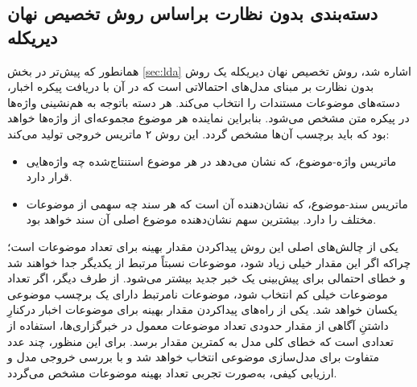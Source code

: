 \subsection{دسته‌بندی بدون‌ نظارت براساس روش تخصیص نهان دیریکله}
\label{section.lda_classification}
همانطور که پیش‌تر در بخش \ref{sec:lda} اشاره شد، روش تخصیص نهان دیریکله \citep{blei2003latent} یک روش بدون‌ نظارت بر مبنای مدل‌های احتمالاتی است که در آن با دریافت  پیکره  اخبار، دسته‌های موضوعات مستندات را انتخاب می‌کند. هر دسته باتوجه ‌به هم‌نشینی واژه‌ها در پیکره متن مشخص می‌شود. بنابراین نماینده هر موضوع مجموعه‌ای از واژه‌ها خواهد بود که باید برچسب آن‌ها مشخص گردد. این روش  ۲ ماتریس خروجی تولید می‌کند:
\begin{itemize}
	\item
	ماتریس واژه-موضوع، که نشان می‌دهد در هر موضوع استنتاج‌شده چه واژه‌هایی قرار دارد.
	\item
	ماتریس سند-موضوع، که نشان‌دهنده آن است که هر سند چه سهمی از موضوعات مختلف را دارد. بیشترین سهم نشان‌دهنده موضوع اصلی آن سند خواهد بود.
\end{itemize}
یکی از چالش‌های اصلی این روش پیداکردن مقدار بهینه برای تعداد موضوعات است؛ چراکه اگر این مقدار خیلی زیاد شود، موضوعات نسبتاً مرتبط از یکدیگر جدا خواهند شد و خطای احتمالی برای پیش‌بینی یک خبر جدید بیشتر می‌شود. از طرف دیگر، اگر تعداد موضوعات خیلی کم انتخاب شود، موضوعات نامرتبط دارای یک برچسب موضوعی یکسان خواهد شد. یکی از راه‌های پیداکردن مقدار بهینه برای موضوعات اخبار درکنارِ داشتنِ آگاهی از مقدار حدودی تعداد موضوعات معمول در خبرگزاری‌ها، استفاده از تعدادی است که خطای کلی مدل به کمترین مقدار برسد. برای این منظور، چند عدد متفاوت برای مدل‌سازی موضوعی انتخاب خواهد شد و با بررسی خروجی مدل و ارزیابی کیفی، به‌صورت تجربی تعداد بهینه موضوعات مشخص می‌گردد.


